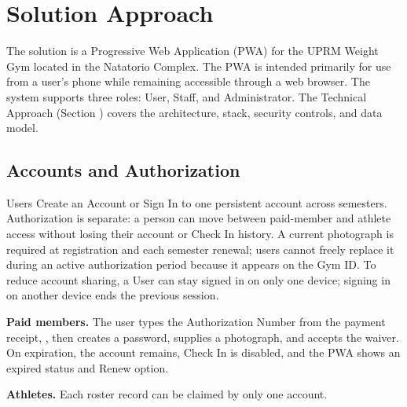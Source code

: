 \section{Solution Approach}

The solution is a Progressive Web Application (PWA) for the UPRM Weight Gym located in the Natatorio Complex. The PWA is intended primarily for use from a user's phone while remaining accessible through a web browser. The system supports three roles: User, Staff, and Administrator. The Technical Approach (Section ) covers the architecture, stack, security controls, and data model.

\subsection{Accounts and Authorization}

Users Create an Account or Sign In to one persistent account across semesters. Authorization is separate: a person can move between paid-member and athlete access without losing their account or Check In history. A current photograph is required at registration and each semester renewal; users cannot freely replace it during an active authorization period because it appears on the Gym ID. To reduce account sharing, a User can stay signed in on only one device; signing in on another device ends the previous session.

\textbf{Paid members.} The user types the Authorization Number from the payment receipt, , then creates a password, supplies a photograph, and accepts the waiver. On expiration, the account remains, Check In is disabled, and the PWA shows an expired status and Renew option.

\textbf{Athletes.}  Each roster record can be claimed by only one account.


